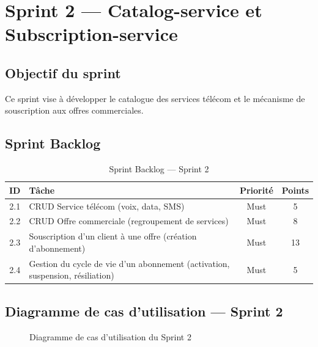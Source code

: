 \section{Sprint 2 --- Catalog-service et Subscription-service}

\subsection{Objectif du sprint}
Ce sprint vise à développer le catalogue des services télécom et le mécanisme de souscription aux offres commerciales.

\subsection{Sprint Backlog}

\begin{table}[H]
\centering
\renewcommand{\arraystretch}{1.2}
\begin{tabular}{|c|p{9cm}|c|c|}
\hline
\textbf{ID} & \textbf{Tâche} & \textbf{Priorité} & \textbf{Points} \\
\hline
2.1 & CRUD Service télécom (voix, data, SMS) & Must & 5 \\
\hline
2.2 & CRUD Offre commerciale (regroupement de services) & Must & 8 \\
\hline
2.3 & Souscription d'un client à une offre (création d'abonnement) & Must & 13 \\
\hline
2.4 & Gestion du cycle de vie d'un abonnement (activation, suspension, résiliation) & Must & 5 \\
\hline
\end{tabular}
\caption{Sprint Backlog --- Sprint 2}
\label{tab:sprint2_backlog}
\end{table}

\subsection{Diagramme de cas d'utilisation --- Sprint 2}

\begin{figure}[H]
    \centering
    \caption{Diagramme de cas d'utilisation du Sprint 2}
    \label{fig:uc_sprint2}
\end{figure}

